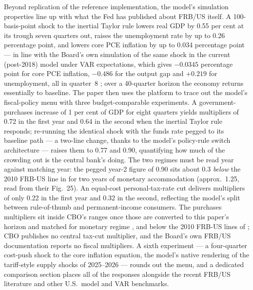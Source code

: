 Beyond replication of the reference implementation, the model's simulation properties line up with what the Fed has published about FRB/US itself. A 100-basis-point shock to the inertial Taylor rule lowers real GDP by 0.55 per cent at its trough seven quarters out, raises the unemployment rate by up to 0.26 percentage point, and lowers core PCE inflation by up to 0.034 percentage point --- in line with the Board's own simulation of the same shock in the current (post-2018) model under VAR expectations, which gives $-0.0345$ percentage point for core PCE inflation, $-0.486$ for the output gap and $+0.219$ for unemployment, all in quarter~8 \citep[Fig.~2]{laforte2018changes}; over a 40-quarter horizon the economy returns essentially to baseline. The paper then uses the platform to trace out the model's fiscal-policy menu with three budget-comparable experiments. A government-purchases increase of 1 per cent of GDP for eight quarters yields multipliers of 0.72 in the first year and 0.64 in the second when the inertial Taylor rule responds; re-running the identical shock with the funds rate pegged to its baseline path --- a two-line change, thanks to the model's policy-rule switch architecture --- raises them to 0.77 and 0.90, quantifying how much of the crowding out is the central bank's doing. The two regimes must be read year against matching year: the pegged year-2 figure of 0.90 sits about 0.3 \emph{below} the 2010 FRB-US line in \citet{coenen2012effects} for two years of monetary accommodation (approx.\ 1.25, read from their Fig.~25). An equal-cost personal-tax-rate cut delivers multipliers of only 0.22 in the first year and 0.32 in the second, reflecting the model's split between rule-of-thumb and permanent-income consumers. The purchases multipliers sit inside CBO's ranges once those are converted to this paper's horizon and matched for monetary regime \citep{whalen2015fiscal}, and below the 2010 FRB-US lines of \citet{coenen2012effects}; CBO publishes no central tax-cut multiplier, and the Board's own FRB/US documentation reports no fiscal multipliers. A sixth experiment --- a four-quarter cost-push shock to the core inflation equation, the model's native rendering of the tariff-style supply shocks of 2025--2026 --- rounds out the menu, and a dedicated comparison section places all of the responses alongside the recent FRB/US literature and other U.S.\ model and VAR benchmarks.

